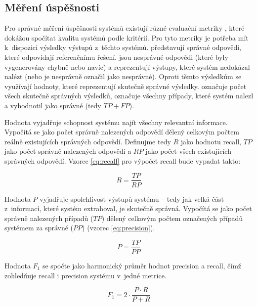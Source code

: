 \documentclass[czech, bc, kiv, he, iso690numb, pdf]{fasthesis}
\begin{document}
\subsection{Měření úspěšnosti}\label{sec:mereni-uspesnosti}
Pro správné měření úspěšnosti systémů existují různé evaluační metriky \cite{eval-metrics}, které dokážou spočítat kvalitu systémů podle kritérií. Pro tyto metriky je potřeba mít k~dispozici výsledky výstupů z~těchto systémů.  představují správné odpovědi, které odpovídají referenčnímu řešení.  jsou nesprávné odpovědi (které byly vygenerovány chybně nebo navíc) a  reprezentují výstupy, které systém nedokázal nalézt (nebo je nesprávně označil jako nesprávné). Oproti těmto výsledkům se využívají hodnoty, které reprezentují skutečně správné výsledky.  označuje počet všech skutečně správných výsledků,  označuje všechny případy, které systém nalezl a vyhodnotil jako správné (tedy $TP + FP$).

Hodnota  vyjadřuje schopnost systému najít všechny relevantní informace. Vypočítá se jako počet správně nalezených odpovědí dělený celkovým počtem reálně existujících správných odpovědí. Definujme tedy $R$ jako hodnotu recall, $TP$ jako počet správně nalezených odpovědí a $RP$ jako počet všech existujících správných odpovědí. Vzorec \ref{eq:recall} pro výpočet recall bude vypadat takto:

\begin{equation}
    \label{eq:recall}
    R = \frac{TP}{RP}
\end{equation}

Hodnota  $P$ vyjadřuje spolehlivost výstupů systému -- tedy jak velká část z~informací, které systém extrahoval, je skutečně správná. Vypočítá se jako počet správně nalezených případů ($TP$) dělený celkovým počtem označených případů systémem  za správné ($PP$) (vzorec \ref{eq:precision}).

\begin{equation}
    \label{eq:precision}
    P = \frac{TP}{PP}
\end{equation}


Hodnota  $F_1$ se spočte jako harmonický průměr hodnot precision a recall, čímž zohledňuje recall i precision systému v~jedné metrice.

\begin{equation}
    \label{eq:f1}
    F_1 = 2 \cdot \frac{P \cdot R}{P + R}
\end{equation}
\end{document}
